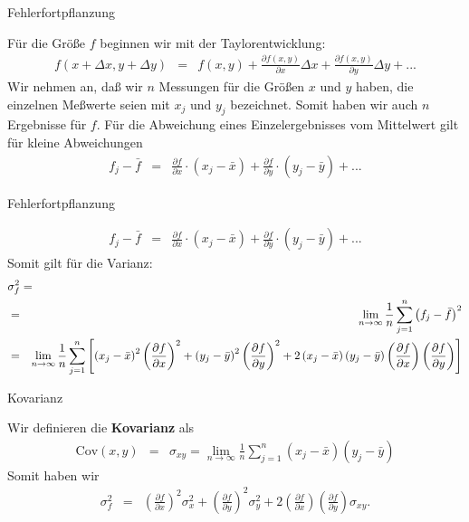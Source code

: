 \documentclass[german]{beamer}
\newcommand{\bq}{\begin{eqnarray*}}
\newcommand{\eq}{\end{eqnarray*}}
\begin{document}
\begin{frame}{Fehlerfortpflanzung}

F\"ur die Gr\"o{\ss}e $f$ beginnen wir mit der Taylorentwicklung:
\bq
 f\left(x+\Delta x, y+ \Delta y \right) 
 & = & f(x,y) + \frac{\partial f(x,y)}{\partial x} \Delta x
              + \frac{\partial f(x,y)}{\partial y} \Delta y 
              + ...
\eq
Wir nehmen an, da{\ss} wir $n$ Messungen f\"ur die Gr\"o{\ss}en $x$ und $y$ haben, die einzelnen
Me{\ss}werte seien mit $x_j$ und $y_j$ bezeichnet.
Somit haben wir auch $n$ Ergebnisse f\"ur $f$.
F\"ur die Abweichung eines Einzelergebnisses vom Mittelwert gilt f\"ur kleine Abweichungen
\bq
 f_j - \bar{f} & = & \frac{\partial f}{\partial x} \cdot \left( x_j - \bar{x} \right)
                   + \frac{\partial f}{\partial y} \cdot \left( y_j - \bar{y} \right)
                   + ...
\eq
\end{frame}

\begin{frame}{Fehlerfortpflanzung}

\bq
 f_j - \bar{f} & = & \frac{\partial f}{\partial x} \cdot \left( x_j - \bar{x} \right)
                   + \frac{\partial f}{\partial y} \cdot \left( y_j - \bar{y} \right)
                   + ...
\eq
Somit gilt f\"ur die Varianz:
{\scriptsize
\bq
\lefteqn{
 \sigma_f^2 = 
} & &
\nonumber \\
 & = & 
 \lim\limits_{n \rightarrow \infty} \frac{1}{n} \sum\limits_{j=1}^n \left( f_j - \bar{f} \right)^2
 \nonumber \\
 & = & 
 \lim\limits_{n \rightarrow \infty} \frac{1}{n} \sum\limits_{j=1}^n 
  \left[ 
         \left( x_j - \bar{x} \right)^2 \left( \frac{\partial f}{\partial x} \right)^2
       + \left( y_j - \bar{y} \right)^2 \left( \frac{\partial f}{\partial y} \right)^2
       + 2 \left( x_j - \bar{x} \right) \left( y_j - \bar{y} \right) 
           \left( \frac{\partial f}{\partial x} \right) \left( \frac{\partial f}{\partial y} \right)
  \right]
\eq
}

\end{frame}

\begin{frame}{Kovarianz}

Wir definieren die {\bf Kovarianz} als
\bq
 \mbox{Cov}(x,y) & = & \sigma_{x y} = 
 \lim\limits_{n \rightarrow \infty} \frac{1}{n} \sum\limits_{j=1}^n 
  \left( x_j - \bar{x} \right) \left( y_j - \bar{y} \right) 
\eq
Somit haben wir
\bq
 \sigma_f^2 & = & 
         \left( \frac{\partial f}{\partial x} \right)^2 \sigma_x^2
       + \left( \frac{\partial f}{\partial y} \right)^2 \sigma_y^2
       + 2 \left( \frac{\partial f}{\partial x} \right) \left( \frac{\partial f}{\partial y} \right)
           \sigma_{xy}.
\eq

\end{frame}
\end{document}
